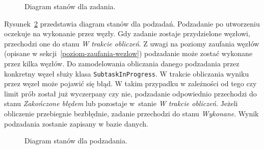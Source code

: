 \documentclass[a4paper,11pt,twoside]{report}
\theoremstyle{definition}
\begin{document}
\begin{figure} 
    \caption{Diagram stanów dla zadania.}
    \label{task-state-diagram}
\end{figure}

Rysunek~\ref{subtask-state-diagram} przedstawia diagram stanów dla podzadań. Podzadanie po utworzeniu oczekuje na wykonanie przez węzły. Gdy zadanie zostaje przydzielone węzłowi, przechodzi one do stanu \textit{W trakcie obliczeń}. Z uwagi na poziomy zaufania węzłów (opisane w sekcji~\ref{poziom-zaufania-wezlow}) podzadanie może zostać wykonane przez kilka węzłów. Do zamodelowania obliczania danego podzadania przez konkretny węzeł służy klasa \texttt{SubtaskInProgress}. W trakcie obliczania wyniku przez węzeł może pojawić się błąd. W takim przypadku w zależności od tego czy limit prób został już wyczerpany czy nie, podzadanie odpowiednio przechodzi do stanu \textit{Zakończone błędem} lub pozostaje w~stanie \textit{W trakcie obliczeń}. Jeżeli obliczenie przebiegnie bezbłędnie, zadanie przechodzi do stanu \textit{Wykonane}. Wynik podzadania zostanie zapisany w bazie danych.

\begin{figure} 
    \caption{Diagram stanów dla podzadania.}
    \label{subtask-state-diagram}
\end{figure}
\end{document}

